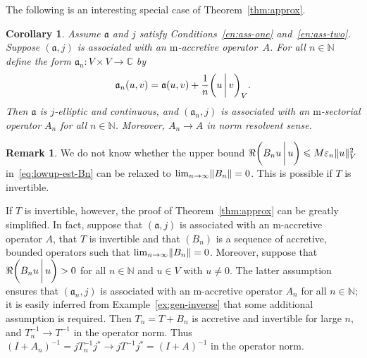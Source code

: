\documentclass[a4paper,oneside,12pt]{amsart}
\theoremstyle{plain}
\newtheorem{corollary}[theorem]{Corollary}
\theoremstyle{definition}
\newtheorem{remark}[theorem]{Remark}
\let\le=\leqslant
\DeclarePairedDelimiter\norm{\lVert}{\rVert}
\begin{document}
The following is an interesting special case of Theorem~\ref{thm:approx}.
\begin{corollary}
Assume ${{\mathfrak{{a}}}}$ and $j$ satisfy Conditions~\ref{en:ass-one} and~\ref{en:ass-two}.
Suppose $({{\mathfrak{{a}}}},j)$ is associated with an {\ensuremath{\text{m}}}-accretive operator~$A$.
For all $n\in{\mathbb{N}}$ define the form ${{\mathfrak{{a}}}}_n\colon V\times V\to{\mathbb{C}}$ by
\[
    {{\mathfrak{{a}}}}_n(u,v)={{\mathfrak{{a}}}}(u,v) + \frac{1}{n}{{\ifthenelse{\equal{auto}{auto}}{\left({u}\mkern3mu{\biggm|}\mkern3mu {v}\right)}{}
\ifthenelse{\equal{auto}{b}}{\bigl({u}\mkern3mu{\biggm|}\mkern3mu {v}\bigr)}{}
\ifthenelse{\equal{auto}{B}}{\Bigl({u}\mkern3mu{\bigm|}\mkern3mu {v}\Bigr)}{}
}}_V.
\]
Then ${{\mathfrak{{a}}}}$ is $j$-elliptic and continuous, and $({{\mathfrak{{a}}}}_n,j)$ is associated with an {\ensuremath{\text{m}}}-sectorial operator $A_n$ for all $n\in{\mathbb{N}}$.
Moreover, $A_n\to A$ in norm resolvent sense.
\end{corollary}

\begin{remark}
We do not know whether the upper bound $\Re{{\ifthenelse{\equal{auto}{auto}}{\left({B_n u}\mkern3mu{\biggm|}\mkern3mu {u}\right)}{}
\ifthenelse{\equal{auto}{b}}{\bigl({B_n u}\mkern3mu{\biggm|}\mkern3mu {u}\bigr)}{}
\ifthenelse{\equal{auto}{B}}{\Bigl({B_n u}\mkern3mu{\bigm|}\mkern3mu {u}\Bigr)}{}
}}\le M{\varepsilon}_n\norm{u}_V^2$ in~\eqref{eq:lowup-est-Bn} can be relaxed to $\lim_{n\to\infty}\norm{B_n}=0$. This is possible if $T$ is invertible.

If $T$ is invertible, however, the proof of Theorem~\ref{thm:approx} can be greatly simplified.
In fact, suppose that $({{\mathfrak{{a}}}},j)$ is associated with an {\ensuremath{\text{m}}}-accretive operator $A$, 
that $T$ is invertible and that $(B_n)$ is a sequence of accretive, bounded operators such that $\lim_{n\to\infty}\norm{B_n}=0$. 
Moreover, suppose that $\Re{{\ifthenelse{\equal{auto}{auto}}{\left({B_nu}\mkern3mu{\biggm|}\mkern3mu {u}\right)}{}
\ifthenelse{\equal{auto}{b}}{\bigl({B_nu}\mkern3mu{\biggm|}\mkern3mu {u}\bigr)}{}
\ifthenelse{\equal{auto}{B}}{\Bigl({B_nu}\mkern3mu{\bigm|}\mkern3mu {u}\Bigr)}{}
}}>0$ for all $n\in{\mathbb{N}}$ and $u\in V$ with $u\ne 0$. 
The latter assumption ensures that $({{\mathfrak{{a}}}}_n,j)$ is associated with an {\ensuremath{\text{m}}}-accretive operator
$A_n$ for all $n\in{\mathbb{N}}$; it is easily inferred from Example~\ref{ex:gen-inverse} that some additional assumption is required.
Then $T_n=T+B_n$ is accretive and invertible for large $n$, and $T_n^{-1}\to T^{-1}$ in the operator norm. 
Thus $(I+A_n)^{-1}= jT_n^{-1}j^*\to jT^{-1}j^*= (I+A)^{-1}$ in the operator norm.
\end{remark}
\end{document}
